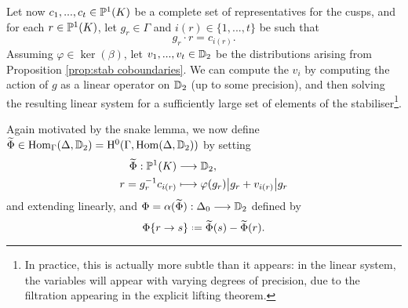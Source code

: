 \documentclass[a4paper,11pt]{article}
\numberwithin{equation}{section}
\begin{document}
Let now $c_1, ..., c_t \in \mathbb{P}^1(K)$ be a complete set of representatives for the cusps, and for each $r \in \mathbb{P}^1(K)$, let $g_r \in \Gamma$ and $i(r) \in \{1,...,t\}$ be such that
\[
	g_r \cdot r = c_{i(r)}. 
\]
Assuming $\varphi \in \ker(\beta)$, let $v_1, ..., v_t \in \mathbb{D}_2$ be the distributions arising from Proposition \ref{prop:stab coboundaries}. We can compute the $v_i$ by computing the action of $g$ as a linear operator on $\mathbb{D}_2$ (up to some precision), and then solving the resulting linear system for a sufficiently large set of elements of the stabiliser\footnote{In practice, this is actually more subtle than it appears: in the linear system, the variables will appear with varying degrees of precision, due to the filtration appearing in the explicit lifting theorem.}.
	
Again motivated by the snake lemma, we now define $\widetilde{\Phi} \in \mathrm{Hom}_\Gamma(\Delta,\mathbb{D}_2) = \mathrm{H}^0(\Gamma,\mathrm{Hom}(\Delta,\mathbb{D}_2))$ by setting
	\begin{align*}
		\widetilde{\Phi} : \mathbb{P}^1(K) &\longrightarrow \mathbb{D}_2,\\
				r = g_r^{-1}c_{i(r)} &\longmapsto \varphi(g_r)\big|g_r + v_{i(r)}\big|g_r
	\end{align*}
	and extending linearly, and $\Phi = \alpha(\widetilde{\Phi}) : \Delta_0 \longrightarrow \mathbb{D}_2$ defined by
	\[
		\Phi\{r\to s\} \defeq \widetilde{\Phi}(s) - \widetilde{\Phi}(r).
	\]



	
\end{document}
